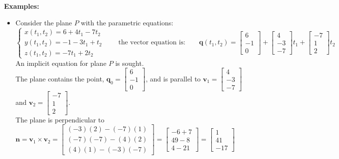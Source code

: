 \documentclass{article}
\begin{document}
\textbf{Examples:}
\begin{itemize}
\item Consider the plane \(P\) with the parametric equations: 
\[\left\{\begin{array}{c} x(t_1, t_2) = 6 + 4t_1 - 7t_2 \\ y(t_1, t_2) = -1 - 3t_1 + t_2 \\ z(t_1, t_2) = -7t_1 + 2t_2 \end{array}\right.
\quad\quad\text{the vector equation is:}\quad\quad
\mathbf{q}(t_1, t_2) = \begin{bmatrix} 6 \\ -1 \\ 0 \end{bmatrix} + \begin{bmatrix} 4 \\ -3 \\ -7 \end{bmatrix}t_1 + \begin{bmatrix} -7 \\ 1 \\ 2 \end{bmatrix}t_2\]
An implicit equation for plane \(P\) is sought. \\  
The plane contains the point, \(\mathbf{q}_0 = \begin{bmatrix} 6 \\ -1 \\ 0 \end{bmatrix}\), and is parallel to \(\mathbf{v}_1 = \begin{bmatrix} 4 \\ -3 \\ -7 \end{bmatrix}\) and \(\mathbf{v}_2 = \begin{bmatrix} -7 \\ 1 \\ 2 \end{bmatrix}\). \\
The plane is perpendicular to \(\mathbf{n} = \mathbf{v}_1 \times \mathbf{v}_2 = \begin{bmatrix} (-3)(2) - (-7)(1) \\ (-7)(-7) - (4)(2) \\ (4)(1) - (-3)(-7) \end{bmatrix} = \begin{bmatrix} -6 + 7 \\ 49 - 8 \\ 4 - 21 \end{bmatrix} = \begin{bmatrix} 1 \\ 41 \\ -17 \end{bmatrix}\) \\  

\end{itemize}
\end{document}
